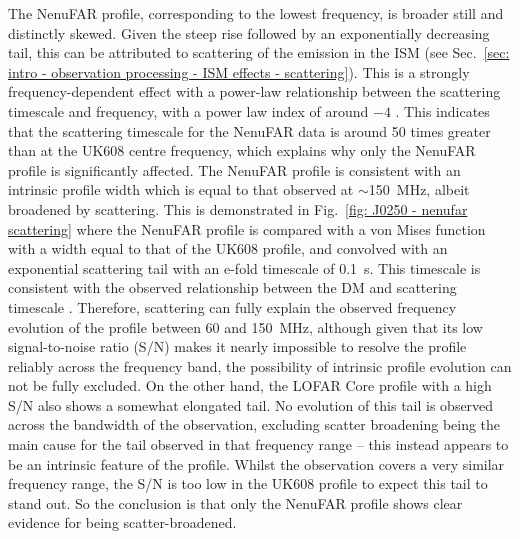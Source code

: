 The NenuFAR profile, corresponding to the lowest frequency, is broader still and distinctly skewed. Given the steep rise followed by an exponentially decreasing tail, this can be attributed to scattering of the emission in the ISM (see Sec.~\ref{sec: intro - observation processing - ISM effects - scattering}). This is a strongly frequency-dependent effect with a power-law relationship between the scattering timescale and frequency, with a power law index of around $-4$ \citep{SDOx1980,PulsarAstronomy, GKK+2017}. This indicates that the scattering timescale for the NenuFAR data is around 50 times greater than at the UK608 centre frequency, which explains why only the NenuFAR profile is significantly affected. The NenuFAR profile is consistent with an intrinsic profile width which is equal to that observed at $\sim$150~MHz, albeit broadened by scattering. This is demonstrated in Fig.~\ref{fig: J0250 - nenufar scattering} where the NenuFAR profile is compared with a von Mises function with a width equal to that of the UK608 profile, and convolved with an exponential scattering tail with an e-fold timescale of 0.1~s. This timescale is consistent with the observed relationship between the DM and scattering timescale \citep[e.g.][]{BCC+2004,IJWx2019}. Therefore, scattering can fully explain the observed frequency evolution of the profile between 60 and 150~MHz, although given that its low signal-to-noise ratio (S/N) makes it nearly impossible to resolve the profile reliably across the frequency band, the possibility of intrinsic profile evolution can not be fully excluded. On the other hand, the LOFAR Core profile with a high S/N also shows a somewhat elongated tail. No evolution of this tail is observed across the bandwidth of the observation, excluding scatter broadening being the main cause for the tail observed in that frequency range -- this instead appears to be an intrinsic feature of the profile. Whilst the observation covers a very similar frequency range, the S/N is too low in the UK608 profile to expect this tail to stand out. So the conclusion is that only the NenuFAR profile shows clear evidence for being scatter-broadened.
